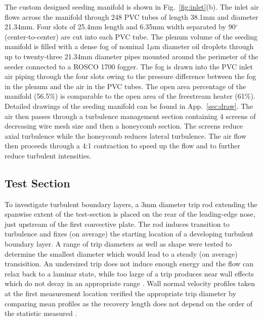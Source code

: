 The custom designed seeding manifold is shown in Fig.~\ref{fig:inlet}(b). 
The inlet air flows across the manifold through 248 PVC tubes of length 38.1mm and diameter 21.34mm. 
Four slots of 25.4mm length and 6.35mm width separated by 90$^\circ$ (center-to-center) are cut into each PVC tube. 
The plenum volume of the seeding manifold is filled with a dense fog of nominal 1$\mu$m  diameter oil droplets \cite{Shakerin1995} through up to twenty-three 21.34mm diameter pipes mounted around the perimeter of the seeder connected to a ROSCO 1700 fogger. 
The fog is drawn into the PVC inlet air piping through the four slots owing to the pressure difference between the fog in the plenum and the air in the PVC tubes. 
The open area percentage of the manifold (56.5\%) is comparable to the open area of the freestream heater (61\%). 
Detailed drawings of the seeding manifold can be found in App.~\ref{sec:draw}.
The air then passes through a turbulence management section containing 4 screens of decreasing wire mesh size and then a honeycomb section.
The screens reduce axial turbulence while the honeycomb reduces lateral turbulence.
The air flow then proceeds through a 4:1 contraction to speed up the flow and to further reduce turbulent intensities.

\subsection{Test Section}

To investigate turbulent boundary layers, a 3mm diameter trip rod extending the spanwise extent of the test-section is placed on the rear of the leading-edge nose, just upstream of the first convective plate.
The rod induces transition to turbulence and fixes (on average) the starting location of a developing turbulent boundary layer.
A range of trip diameters as well as shape were tested to determine the smallest diameter which would lead to a steady (on average) transisition. 
An undersized trip does not induce enough energy and the flow can relax back to a laminar state, while too large of a trip produces near wall effects which do not decay in an appropriate range \cite{Marusic2015}.
Wall normal velocity profiles taken at the first measurement location verified the appropriate trip diameter by comparing mean profiles as the recovery length does not depend on the order of the statistic measured \cite{Marusic2015}.


